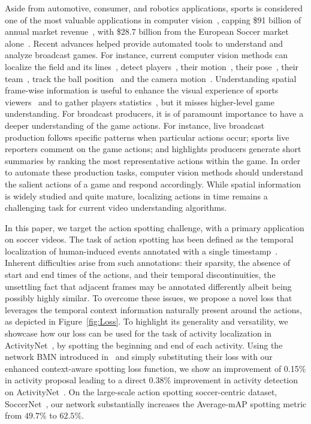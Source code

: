 \documentclass[10pt,twocolumn,letterpaper]{article}
\begin{document}
Aside from automotive, consumer, and robotics applications, sports is considered one of the most valuable applications in computer vision~\cite{CVApplication}, capping \$91 billion of annual market revenue~\cite{GlobalSportsMarket}, with \$28.7 billion from the European Soccer market alone~\cite{EuropeanFootballMarket}. Recent advances helped provide automated tools to understand and analyze broadcast games. For instance, current computer vision methods can localize the field and its lines~\cite{farin2003robust,homayounfar2017sports}, detect players~\cite{Cioppa_2019_CVPR_Workshops,yang2017robust}, their motion~\cite{felsen2017will,manafifard2017survey}, their pose~\cite{Bridgeman_2019_CVPR_Workshops, Zecha_2019_CVPR_Workshops}, their team~\cite{Istasse_2019_CVPR_Workshops}, track the ball position~\cite{Sarkar_2019_CVPR_Workshops,Theagarajan_2018_CVPR_Workshops} and the camera motion~\cite{Lu2019Pan}. 
Understanding spatial frame-wise information is useful to enhance the visual experience of sports viewers~\cite{Rematas_2018_CVPR} and to gather players statistics~\cite{thomas2017computer}, but 
it misses higher-level game understanding.
For broadcast producers, it is of paramount importance to have a deeper understanding of the game actions. For instance, live broadcast production follows specific patterns when particular actions occur; sports live reporters comment on the game actions; and highlights producers generate short summaries by ranking the most representative actions within the game.  In order to automate these production tasks, computer vision methods should understand the salient actions of a game and respond accordingly. While spatial information is widely studied and quite mature, 
localizing actions in time remains a challenging task for current video understanding algorithms.


In this paper, we target the action spotting challenge, with a primary application on soccer videos. The task of action spotting has been defined as the temporal localization of human-induced events annotated with a single timestamp~\cite{Giancola_2018_CVPR_Workshops}. Inherent difficulties arise from such annotations: their sparsity, the absence of start and end times of the actions, and their temporal discontinuities, \ie the unsettling fact that adjacent frames may be annotated differently albeit being possibly highly similar. To overcome these issues, we propose a novel loss that leverages the temporal context information naturally present around the actions, as depicted in Figure~\ref{fig:Loss}. To highlight its generality and versatility, we showcase how our loss can be used for the task of activity localization in ActivityNet~\cite{caba2015activitynet}, by spotting the beginning and end of each activity. Using the network BMN introduced in~\cite{Lin_2019_ICCV} and simply substituting their loss with our enhanced context-aware spotting loss function, we show an improvement of 0.15\% in activity proposal leading to a direct 0.38\% improvement in activity detection on ActivityNet~\cite{caba2015activitynet}. On the large-scale action spotting soccer-centric dataset, SoccerNet~\cite{Giancola_2018_CVPR_Workshops}, our network substantially increases the Average-mAP spotting metric from $49.7\%$ to $62.5\%$. 
\end{document}
